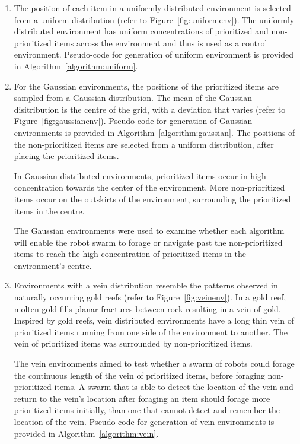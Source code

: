 \begin{enumerate}

\item The position of each item in a uniformly distributed environment is selected from a uniform distribution (refer to Figure~\ref{fig:uniformenv}). The uniformly distributed environment has uniform concentrations of prioritized and non-prioritized items across the environment and thus is used as a control environment. Pseudo-code for generation of uniform environment is provided in Algorithm~\ref{algorithm:uniform}.

\item For the Gaussian environments, the positions of the prioritized items are sampled from a Gaussian distribution. The mean of the Gaussian disitribution is the centre of the grid, with a deviation that varies (refer to Figure~\ref{fig:gaussianenv}). Pseudo-code for generation of Gaussian environments is provided in Algorithm~\ref{algorithm:gaussian}. The positions of the non-prioritized items are selected from a uniform distribution, after placing the prioritized items. 

In Gaussian distributed environments, prioritized items  occur in high concentration towards the center of the environment. More non-prioritized items occur on the outskirts of the environment, surrounding the prioritized items in the centre.

The Gaussian environments were used to examine whether each algorithm will enable the robot swarm to forage or navigate past the non-prioritized items to reach the high concentration of prioritized items in the environment's centre. 


\item Environments with a vein distribution resemble the patterns observed in naturally occurring gold reefs \cite{frimmel2002recent} (refer to Figure~\ref{fig:veinenv}). In a gold reef, molten gold fills planar fractures between rock resulting in a vein of gold. Inspired by gold reefs, vein distributed environments have a long thin vein of prioritized items running from one side of the environment to another. The vein of prioritized items was surrounded by non-prioritized items. 

The vein environments aimed to test whether a swarm of robots could forage the continuous length of the vein of prioritized items, before foraging non-prioritized items. A swarm that is able to detect the location of the vein and return to the vein's location after foraging an item should forage more prioritized items initially, than one that cannot detect and remember the location of the vein.  Pseudo-code for generation of vein environments is provided in Algorithm~\ref{algorithm:vein}.



\end{enumerate}
